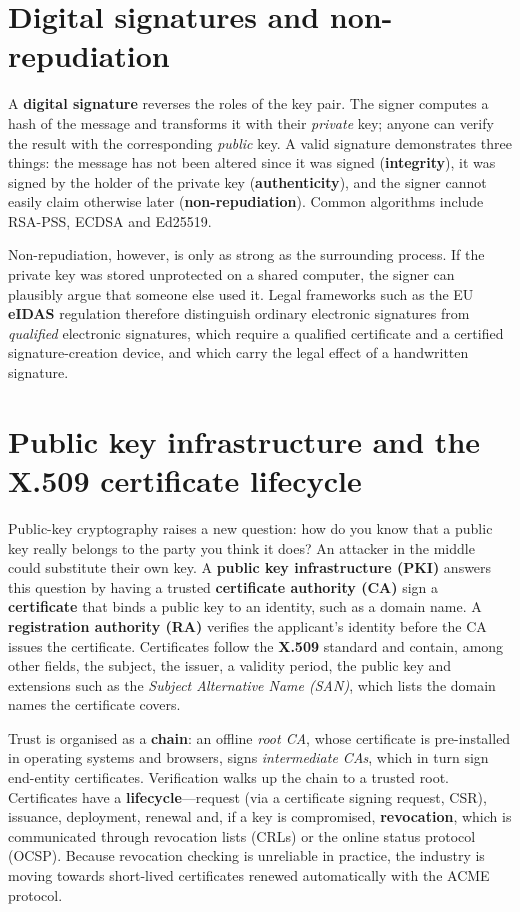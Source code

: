 \section{Digital signatures and non-repudiation}\label{sec:7.3}
A \textbf{digital signature} reverses the roles of the key pair. The signer computes a hash of the message and transforms it with their \emph{private} key; anyone can verify the result with the corresponding \emph{public} key. A valid signature demonstrates three things: the message has not been altered since it was signed (\textbf{integrity}), it was signed by the holder of the private key (\textbf{authenticity}), and the signer cannot easily claim otherwise later (\textbf{non-repudiation}). Common algorithms include RSA-PSS, ECDSA and Ed25519.

Non-repudiation, however, is only as strong as the surrounding process. If the private key was stored unprotected on a shared computer, the signer can plausibly argue that someone else used it. Legal frameworks such as the EU \textbf{eIDAS} regulation therefore distinguish ordinary electronic signatures from \emph{qualified} electronic signatures, which require a qualified certificate and a certified signature-creation device, and which carry the legal effect of a handwritten signature.

\section{Public key infrastructure and the X.509 certificate lifecycle}\label{sec:7.4}
Public-key cryptography raises a new question: how do you know that a public key really belongs to the party you think it does? An attacker in the middle could substitute their own key. A \textbf{public key infrastructure (PKI)} answers this question by having a trusted \textbf{certificate authority (CA)} sign a \textbf{certificate} that binds a public key to an identity, such as a domain name. A \textbf{registration authority (RA)} verifies the applicant's identity before the CA issues the certificate. Certificates follow the \textbf{X.509} standard and contain, among other fields, the subject, the issuer, a validity period, the public key and extensions such as the \emph{Subject Alternative Name (SAN)}, which lists the domain names the certificate covers.

Trust is organised as a \textbf{chain}: an offline \emph{root CA}, whose certificate is pre-installed in operating systems and browsers, signs \emph{intermediate CAs}, which in turn sign end-entity certificates. Verification walks up the chain to a trusted root. Certificates have a \textbf{lifecycle}—request (via a certificate signing request, CSR), issuance, deployment, renewal and, if a key is compromised, \textbf{revocation}, which is communicated through revocation lists (CRLs) or the online status protocol (OCSP). Because revocation checking is unreliable in practice, the industry is moving towards short-lived certificates renewed automatically with the ACME protocol.

